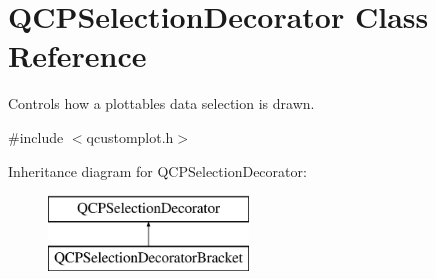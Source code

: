 \hypertarget{class_q_c_p_selection_decorator}{}\section{Q\+C\+P\+Selection\+Decorator Class Reference}
\label{class_q_c_p_selection_decorator}


Controls how a plottable\textquotesingle{}s data selection is drawn.  




{\ttfamily \#include $<$qcustomplot.\+h$>$}

Inheritance diagram for Q\+C\+P\+Selection\+Decorator\+:\begin{figure}[H]
\begin{center}
\leavevmode
\includegraphics[height=2.000000cm]{d3/d7f/class_q_c_p_selection_decorator}
\end{center}
\end{figure}
